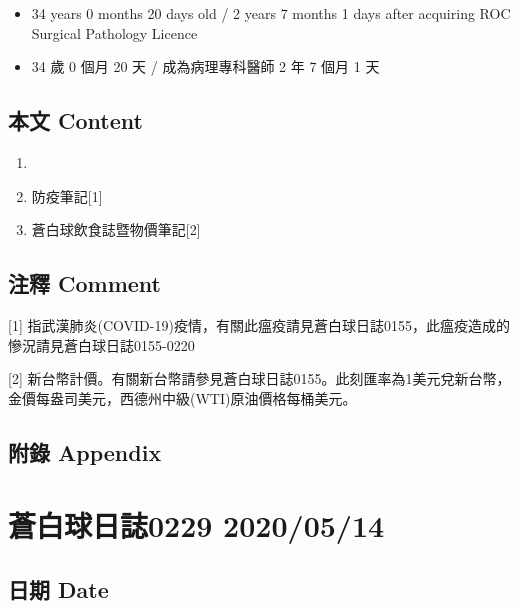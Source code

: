 \documentclass[
]{article}
\providecommand{\tightlist}{%
  \setlength{\itemsep}{0pt}\setlength{\parskip}{0pt}}
\begin{document}
\begin{itemize}
\tightlist
\item
  34 years 0 months 20 days old / 2 years 7 months 1 days after
  acquiring ROC Surgical Pathology Licence
\item
  34 歲 0 個月 20 天 / 成為病理專科醫師 2 年 7 個月 1 天
\end{itemize}

\hypertarget{ux672cux6587-content-12}{%
\subsection{本文 Content}\label{ux672cux6587-content-12}}

\begin{enumerate}
\def\labelenumi{\arabic{enumi}.}
\item
\item
  防疫筆記{[}1{]}
\item
  蒼白球飲食誌暨物價筆記{[}2{]}
\end{enumerate}

\hypertarget{ux6ce8ux91cb-comment-12}{%
\subsection{注釋 Comment}\label{ux6ce8ux91cb-comment-12}}

{[}1{]}
指武漢肺炎(COVID-19)疫情，有關此瘟疫請見蒼白球日誌0155，此瘟疫造成的慘況請見蒼白球日誌0155-0220

{[}2{]}
新台幣計價。有關新台幣請參見蒼白球日誌0155。此刻匯率為1美元兌新台幣，金價每盎司美元，西德州中級(WTI)原油價格每桶美元。

\hypertarget{ux9644ux9304-appendix-12}{%
\subsection{附錄 Appendix}\label{ux9644ux9304-appendix-12}}

\hypertarget{ux84bcux767dux7403ux65e5ux8a8c0229-20200514}{%
\section{蒼白球日誌0229
2020/05/14}\label{ux84bcux767dux7403ux65e5ux8a8c0229-20200514}}

\hypertarget{ux65e5ux671f-date-13}{%
\subsection{日期 Date}\label{ux65e5ux671f-date-13}}
\end{document}
